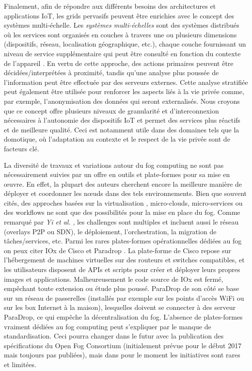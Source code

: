 Finalement, afin de répondre aux différents besoins des architectures et applications IoT, les grids pervasifs peuvent être enrichies avec le concept des systèmes multi-échelle. Les \textit {systèmes multi-échelles} sont des systèmes distribués où les services sont organisés en couches à travers une ou plusieurs dimensions (dispositifs, réseau, localisation géographique, etc.), chaque couche fournissant un niveau de service supplémentaire qui peut être consulté en fonction du contexte de l'appareil \cite{Rottenberg2012,Rottenberg2014}.  En vertu de cette approche, des actions primaires peuvent être décidées/interprétées à proximité, tandis qu'une analyse plus poussée de l'information peut être effectuée par des serveurs externes. Cette analyse stratifiée peut également être utilisée pour renforcer les aspects liés à la vie privée comme, par exemple, l'anonymisation des données qui seront externalisés. Nous croyons que ce concept offre plusieurs niveaux de granularité et d'interconnexion nécessaires à l'autonomie des dispositifs IoT et permet des services plus réactifs et de meilleure qualité. Ceci est notamment utile dans des domaines tels que la domotique, où l'adaptation au contexte et le respect de la vie privée sont de facteurs clé.

La diversité de travaux et variations autour du fog computing ne sont pas nécessairement suivies par un offre en outils et plate-formes pour sa mise en {\oe}uvre. En effet, la plupart des auteurs cherchent encore la meilleure manière de déployer et coordonner les n{\oe}uds dans des tels environnements. Bien que souvent cités, des approches basées sur la virtualisation \cite{Satyanarayanan09}, micro-clouds\cite{Elkhatib2017},  micro-services \cite{Villari2016} ou des workflows \cite{Hao2017} ne sont que des possibilités pour la mise en place du fog. Comme remarqué par \textit{Yi et al.} \cite{Yi2015}, les challenges sont multiples et incluent aussi le réseau (overlays P2P ou SDN), le déploiement, l'orchestration, la migration de tâches/services, etc. Parmi les rares plates-formes opérationnelles dédiées au fog on peux citer IOx de Cisco \cite{IOx2017} et Paradrop \cite{Willis2014}. La plate-forme de Cisco repose sur l'hébergement de machines virtuelles sur des routeurs et switches compatibles, et les utilisateurs disposent de APIs et scripts pour créer et déployer leurs propres images et applications. Malheureusement le code source de IOx est fermé, empêchant toute extension ou étude plus poussé. ParaDrop de son côté se base sur un réseau de passerelles (installés par exemple sur les points d'accès WiFi ou sur les box Internet à la maison), lesquelles doivent se connecter à des serveur ParaDrop, ce qui empêche la décentralisation du fog. L'absence de plates-formes vraiment dédiées au fog computing peut s'expliquer par le manque de standardisation. Ceci pourra changer dans le futur avec la publication des spécifications du Open Fog Consortium (initialement prévue pour le début 2017 mais toujours pas publiées), mais dans pour le moment les initiatives sont rares et limitées.
 
